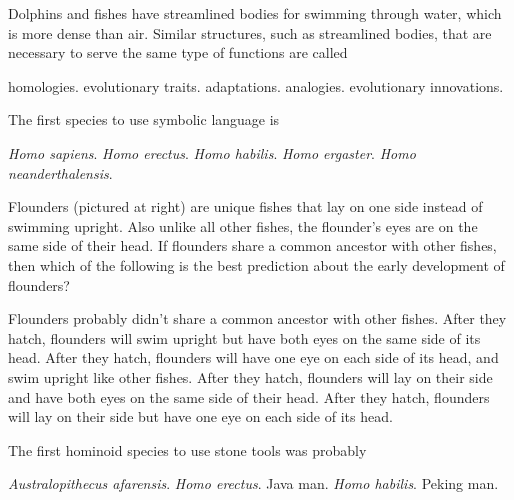 \question
Dolphins and fishes have streamlined bodies for swimming through water, which is more dense than air. Similar structures, such as streamlined bodies, that are necessary to serve the same type of functions are called

\begin{choices}
\choice homologies.%
\choice evolutionary traits.%
\choice adaptations.%
\correctchoice analogies.%
\choice evolutionary innovations.%
\end{choices}

\question
The first species to use symbolic language is

\begin{choices}
\correctchoice \textit{Homo sapiens}.%
\choice \textit{Homo erectus}.%
\choice \textit{Homo habilis}.%
\choice \textit{Homo ergaster}.%
\choice \textit{Homo neanderthalensis}.%
\end{choices}

\question
Flounders (pictured at right) are unique fishes that lay on one side instead of swimming upright. Also unlike all other fishes, the flounder's eyes are on the same side of their head. If flounders share a common ancestor with other fishes, then which of the following is the best prediction about the early development of flounders?

\begin{choices}
\choice Flounders probably didn't share a common ancestor with other fishes.%
\choice After they hatch, flounders will swim upright but have both eyes on the same side of its head.%
\correctchoice After they hatch, flounders will have one eye on each side of its head, and swim upright like other fishes.%
\choice After they hatch, flounders will lay on their side and have both eyes on the same side of their head.%
\choice After they hatch, flounders will lay on their side but have one eye on each side of its head.%
\end{choices}

\question
The first hominoid species to use stone tools was probably

\begin{choices}
\choice \textit{Australopithecus afarensis}.%
\choice \textit{Homo erectus}.%
\choice Java man.%
\correctchoice \textit{Homo habilis}.%
\choice Peking man.%
\end{choices}

